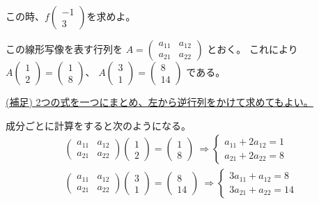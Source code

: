 \documentclass[10pt,b5paper]{ltjsarticle}
\begin{document}
\begin{enumerate}
      この時、$f\left(\begin{matrix}-1\\3\end{matrix}\right)$を求めよ。


      この線形写像を表す行列を
               $A=\left(\begin{matrix}a_{11}&a_{12}\\a_{21}&a_{22}\end{matrix}\right)$
      とおく。
      これにより
      $A\left(\begin{matrix}1\\2\end{matrix}\right)=
      \left(\begin{matrix}1\\8\end{matrix}\right)$、
      $A\left(\begin{matrix}3\\1\end{matrix}\right)=
      \left(\begin{matrix}8\\14\end{matrix}\right)$
      である。

      \underline{(補足)
      2つの式を一つにまとめ、左から逆行列をかけて求めてもよい。}

      成分ごとに計算をすると次のようになる。
      \begin{gather}
             \left(\begin{matrix}a_{11}&a_{12}\\a_{21}&a_{22}\end{matrix}\right)
             \left(\begin{matrix}1\\2\end{matrix}\right)=
             \left(\begin{matrix}1\\8\end{matrix}\right)
       \ \Rightarrow 
       \begin{cases}
        a_{11}+2a_{12}=1\\
        a_{21}+2a_{22}=8
       \end{cases}\\
             \left(\begin{matrix}a_{11}&a_{12}\\a_{21}&a_{22}\end{matrix}\right)
             \left(\begin{matrix}3\\1\end{matrix}\right)=
             \left(\begin{matrix}8\\14\end{matrix}\right)
       \ \Rightarrow 
       \begin{cases}
        3a_{11}+a_{12}=8\\
        3a_{21}+a_{22}=14
       \end{cases}
      \end{gather}


\end{enumerate}
\end{document}
